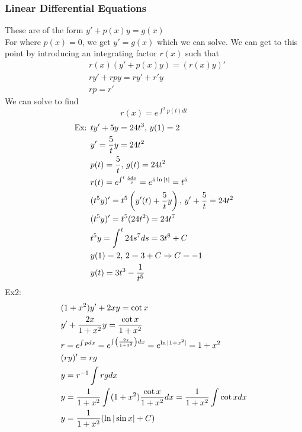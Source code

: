 \documentclass[11pt, fleqn]{article}
\begin{document}
\subsubsection{Linear Differential Equations}
These are of the form $y'+p(x)y=g(x)$\\
For where $p(x)=0$, we get $y'=g(x)$ which we can solve. We can get to this point by introducing an integrating factor $r(x)$ such that
\begin{align*}
    &r(x)(y'+p(x)y)=(r(x)y)'\\
    &ry'+rpy=ry'+r'y\\
    &rp=r'
\end{align*}
We can solve to find
$$r(x)=e^{\int^xp(t)dt}$$
\begin{align*}
    \text{Ex: }&ty'+5y=24t^3,\,y(1)=2\\
    &y'=\frac{5}{t}y=24t^2\\
    &p(t)=\frac{5}{t},\,g(t)=24t^2\\
    &r(t)=e^{\int^t\frac{5ds}{s}}=e^{5\ln|t|}=t^5\\
    &(t^5y)'=t^5\left( y'(t)+\frac{5}{t}y \right),\,y'+\frac{5}{t}=24t^2\\
    &(t^5y)'=t^5(24t^2)=24t^7\\
    &t^5y=\int^t24s^7ds=3t^8+C\\
    &y(1)=2,\,2=3+C\Rightarrow C=-1\\
    &y(t)=3t^3-\frac{1}{t^5}
\end{align*}
Ex2:
\begin{align*}
    &(1+x^2)y'+2xy=\cot x\\
    &y'+\frac{2x}{1+x^2}y=\frac{\cot x}{1+x^2}\\
    &r=e^{\int pdx}=e^{\int\left( \frac{2x}{1+x^2} \right)dx}=e^{\ln|1+x^2|}=1+x^2\\
    &(ry)'=rg\\
    &y=r^{-1}\int rg dx\\
    &y=\frac{1}{1+x^2}\int(1+x^2)\frac{\cot x}{1+x^2}dx=\frac{1}{1+x^2}\int\cot x dx\\
    &y=\frac{1}{1+x^2}(\ln|\sin x|+C)
\end{align*}
\end{document}
